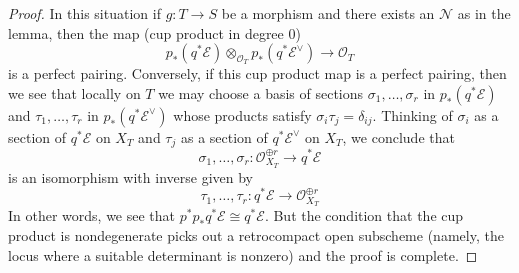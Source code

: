 \documentclass[10pt,a4paper]{amsart}
\theoremstyle{plain}
\theoremstyle{definition}
\theoremstyle{remark}
\numberwithin{equation}{subsection}
\begin{document}
\begin{proof}
\medskip\noindent
In this situation if $g : T \to S$ be a morphism and there exists an
$\mathcal{N}$ as in the lemma, then the map (cup product in degree $0$)
$$
p_*(q^*\mathcal{E})
\otimes_{\mathcal{O}_T}
p_*(q^*\mathcal{E}^\vee)
\longrightarrow \mathcal{O}_T
$$
is a perfect pairing. Conversely, if this cup product map is a
perfect pairing, then we see that locally on $T$ we may choose a
basis of sections
$\sigma_1, \ldots, \sigma_r$ in $p_*(q^*\mathcal{E})$
and $\tau_1, \ldots, \tau_r$ in $p_*(q^*\mathcal{E}^\vee)$
whose products satisfy $\sigma_i \tau_j = \delta_{ij}$.
Thinking of $\sigma_i$ as a section of $q^*\mathcal{E}$ on $X_T$
and $\tau_j$ as a section of $q^*\mathcal{E}^\vee$ on $X_T$,
we conclude that
$$
\sigma_1, \ldots, \sigma_r :
\mathcal{O}_{X_T}^{\oplus r}
\longrightarrow
q^*\mathcal{E}
$$
is an isomorphism with inverse given by
$$
\tau_1, \ldots, \tau_r :
q^*\mathcal{E}
\longrightarrow
\mathcal{O}_{X_T}^{\oplus r}
$$
In other words, we see that $p^*p_*q^*\mathcal{E} \cong q^*\mathcal{E}$.
But the condition that the cup product is nondegenerate picks
out a retrocompact open subscheme (namely, the locus where a suitable
determinant is nonzero) and the proof is complete.
\end{proof}
\end{document}
